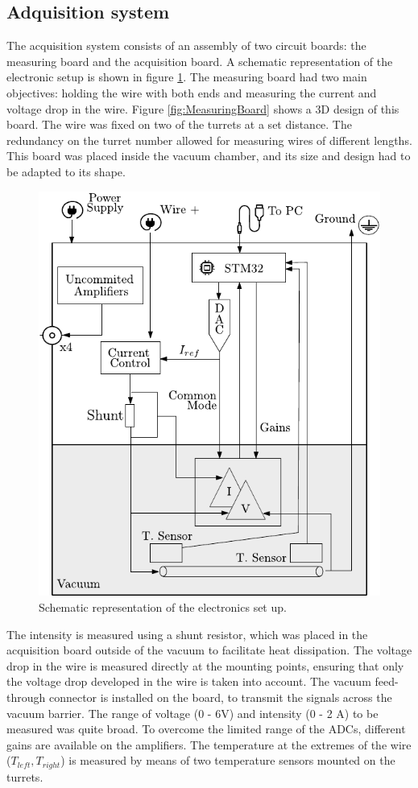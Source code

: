 \subsection{Adquisition system}

The acquisition system consists of an assembly of two circuit boards: the measuring board and the acquisition board. A schematic representation of the electronic setup is shown in figure \ref{fig:SchemaElectronics}. The measuring board had two main objectives: holding the wire with both ends and measuring the current and voltage drop in the wire. Figure \ref{fig:MeasuringBoard} shows a 3D design of this board. The wire was fixed on two of the turrets at a set distance. The redundancy on the turret number allowed for measuring wires of different lengths. This board was placed inside the vacuum chamber, and its size and design had to be adapted to its shape.

\begin{figure}[h]
    \centering
    \includegraphics[width=0.60\columnwidth]{ElectronicSchema/ElectronicSchema.pdf}
    \caption{Schematic representation of the electronics set up. }
    \label{fig:SchemaElectronics}
\end{figure}

The intensity is measured using a shunt resistor, which was placed in the acquisition board outside of the vacuum to facilitate heat dissipation. The voltage drop in the wire is measured directly at the mounting points, ensuring that only the voltage drop developed in the wire is taken into account. The vacuum feed-through connector is installed on the board, to transmit the signals across the vacuum barrier. The range of voltage (0 - 6V) and intensity (0 - 2 A) to be measured was quite broad. To overcome the limited range of the ADCs, different gains are available on the amplifiers. The temperature at the extremes of the wire ($T_{left}, T_{right}$) is measured by means of two temperature sensors mounted on the turrets. 

